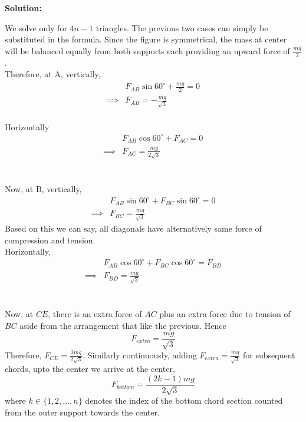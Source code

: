 \documentclass{article}
\theoremstyle{definition}
\newenvironment{solution}
  {\par\vspace{0.5em}\noindent\textbf{Solution:}\par\nopagebreak\vspace{0.3em}}
  {\par\vspace{1em}}
\begin{document}
\begin{solution}
    \noindent
    \begin{minipage}[c]{0.85\textwidth}
      \vspace{0pt}
      We solve only for $4n-1$ triangles. The previous two cases can simply be substituted in the formula. Since the figure is symmetrical, the mass at center will be balanced equally from both supports each providing an upward force of $\frac{mg}{2}$.
      \\Therefore, at A, vertically,
      \\
      \begin{align*}
          &F_{AB} \sin 60^\circ +\frac{mg}{2} = 0
          \\ \implies &F_{AB}=- \frac{mg}{\sqrt{3}}
      \end{align*}
      \\Horizontally
      \begin{align*}
          &F_{AB} \cos 60^\circ +F_{AC} = 0
          \\ \implies &F_{AC}= \frac{mg}{2\sqrt{3}} 
      \end{align*}
      \\
      \\Now, at B, vertically,
      \begin{align*}
          &F_{AB} \sin 60^\circ +F_{BC}\sin 60^\circ = 0
          \\ \implies &F_{BC}= \frac{mg}{\sqrt{3}} 
      \end{align*}
      Based on this we can say, all diagonals have alternatively same force of compression and tension.
      \\Horizontally, 
      \begin{align*}
          &F_{AB} \cos 60^\circ +F_{BC}\cos 60^\circ = F_{BD}
          \\ \implies &F_{BD}= \frac{mg}{\sqrt{3}}
      \end{align*}
      \\
      \\Now, at $CE$, there is an extra force of $AC$ plus an extra force due to tension of $BC$ aside from the arrangement that like the previous. Hence 
      $$F_{extra}=\frac{mg}{ \sqrt{3}} $$
      Therefore, $F_{CE}=\frac{3mg}{ 2\sqrt{3}}$. Similarly continuously, adding $F_{extra}=\frac{mg}{ \sqrt{3}} $ for subsequent chords, upto the center we arrive at the center,
      $$F_{bottom}=\frac{(2k-1) mg}{ 2\sqrt{3}}$$  where $k \in \{1, 2, \dots, n\}$ denotes the index of the bottom chord section counted from the outer support towards the center.

\end{minipage}
\end{solution}
\end{document}
